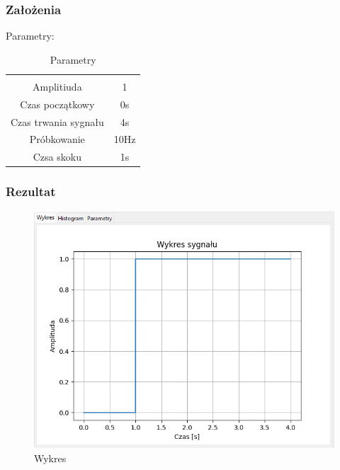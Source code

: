 \documentclass{article}
\begin{document}
\subsubsection{Założenia}
\noindent
Parametry:
\begin{table}[h!]
    \centering
    \vspace{0.2cm}
    \begin{tabular}{|c|c|}
        \hline\hline\\[-0.4cm]
        Amplitiuda & 1  \\
        \hline
        Czas początkowy & 0s  \\
        \hline
        Czas trwania sygnału & 4s  \\
        \hline
        Próbkowanie & 10Hz \\
        \hline
        Czsa skoku & 1s\\
        \hline
    \end{tabular}
    \caption{Parametry}
    \label{impuls}
\end{table}
\subsubsection{Rezultat}
\begin{figure}[h!]
    \centering
    \includegraphics[width=\textwidth]{img/skok/wykres.png}
    \caption{Wykres}
\end{figure}
\end{document}
